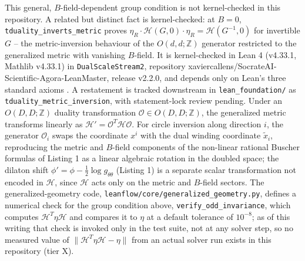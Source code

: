 \documentclass[11pt,a4paper]{article}
\newcommand{\numreconcile}[2]{#1}
\begin{document}
This general, $B$-field-dependent group condition is not kernel-checked in this repository. A related but distinct fact is kernel-checked: at $B=0$, \texttt{tduality\_inverts\_metric} proves $\eta_R \cdot \mathcal{H}(G,0) \cdot \eta_R = \mathcal{H}(G^{-1},0)$ for invertible $G$ -- the metric-inversion behaviour of the $O(d,d;\mathbb{Z})$ generator restricted to the generalized metric with vanishing $B$-field. It is kernel-checked in Lean 4 (v4.33.1, Mathlib v4.33.1) in \texttt{DualScaleStream2}, repository xaviercallens/SocrateAI-Scientific-Agora-LeanMaster, release v2.2.0, and depends only on Lean's three standard axioms \cite{leanmaster2026}. A restatement is tracked downstream in \texttt{lean\_foundation/} as \texttt{tduality\_metric\_inversion}, with statement-lock review pending. Under an $O(D, D; \mathbb{Z})$ duality transformation $\mathcal{O} \in O(D, D; \mathbb{Z})$, the generalized metric transforms linearly as $\mathcal{H}' = \mathcal{O}^T \mathcal{H} \mathcal{O}$. For circle inversion along direction $i$, the generator $\mathcal{O}_i$ swaps the coordinate $x^i$ with the dual winding coordinate $\tilde{x}_i$, reproducing the metric and $B$-field components of the non-linear rational Buscher formulas of Listing 1 as a linear algebraic rotation in the doubled space; the dilaton shift $\phi' = \phi - \tfrac{1}{2}\log g_{\theta\theta}$ (Listing 1) is a separate scalar transformation not encoded in $\mathcal{H}$, since $\mathcal{H}$ acts only on the metric and $B$-field sectors. The generalized-geometry code, \texttt{leanflow/core/generalized\_geometry.py}, defines a numerical check for the group condition above, \texttt{verify\_odd\_invariance}, which computes $\mathcal{H}^T \eta \mathcal{H}$ and compares it to $\eta$ at a default tolerance of $\numreconcile{10^{-8}}{oddInvarianceTol}$; as of this writing that check is invoked only in the test suite, not at any solver step, so no measured value of $\|\mathcal{H}^T \eta \mathcal{H} - \eta\|$ from an actual solver run exists in this repository (tier X).
\end{document}
